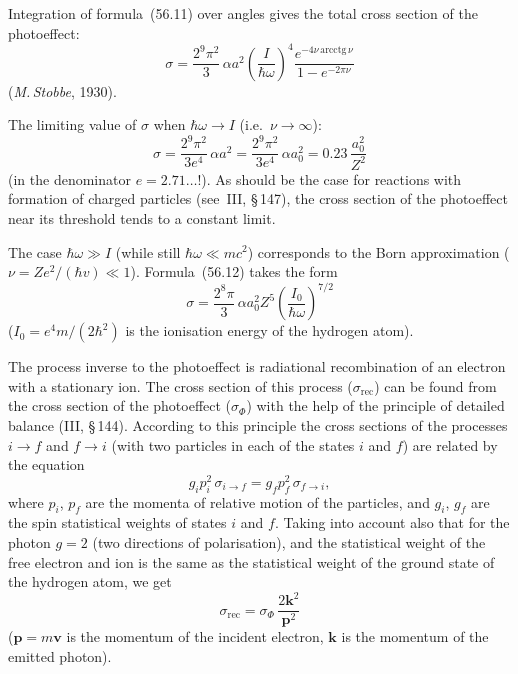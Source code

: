 Integration of formula~(56.11) over angles gives the total cross section of the photoeffect:
\begin{equation}
\sigma = \frac{2^9\pi^2}{3}\,\alpha a^2\left(\frac{I}{\hbar\omega}\right)^{\!4}\frac{e^{-4\nu\,\mathrm{arcctg}\,\nu}}{1-e^{-2\pi\nu}}
\tag{56.12}
\end{equation}
(\textit{M.\,Stobbe}, 1930).

The limiting value of $\sigma$ when $\hbar\omega \to I$ (i.e.\ $\nu \to \infty$):
\begin{equation}
\sigma = \frac{2^9\pi^2}{3e^4}\,\alpha a^2 = \frac{2^9\pi^2}{3e^4}\,\alpha a^2_0 = 0.23\,\frac{a^2_0}{Z^2}
\tag{56.13}
\end{equation}
(in the denominator $e = 2.71\ldots$!). As should be the case for reactions with formation of charged particles (see~III, \S\,147), the cross section of the photoeffect near its threshold tends to a constant limit.

The case $\hbar\omega \gg I$ (while still $\hbar\omega \ll mc^2$) corresponds to the Born approximation ($\nu = Ze^2/(\hbar v) \ll 1$). Formula~(56.12) takes the form
\begin{equation}
\sigma = \frac{2^8\pi}{3}\,\alpha a^2_0 Z^5\left(\frac{I_0}{\hbar\omega}\right)^{\!7/2}
\tag{56.14}
\end{equation}
($I_0 = e^4m/(2\hbar^2)$ is the ionisation energy of the hydrogen atom).

The process inverse to the photoeffect is radiational recombination of an electron with a stationary ion. The cross section of this process ($\sigma_\mathrm{rec}$) can be found from the cross section of the photoeffect ($\sigma_\Phi$) with the help of the principle of detailed balance (III, \S\,144). According to this principle the cross sections of the processes $i \to f$ and $f \to i$ (with two particles in each of the states $i$ and $f$) are related by the equation
\[
g_i p^2_i\,\sigma_{i\to f} = g_f p^2_f\,\sigma_{f\to i},
\]
where $p_i$, $p_f$ are the momenta of relative motion of the particles, and $g_i$, $g_f$ are the spin statistical weights of states $i$ and $f$. Taking into account also that for the photon $g = 2$ (two directions of polarisation), and the statistical weight of the free electron and ion is the same as the statistical weight of the ground state of the hydrogen atom, we get
\begin{equation}
\sigma_\mathrm{rec} = \sigma_\Phi\,\frac{2\mathbf{k}^2}{\mathbf{p}^2}
\tag{56.15}
\end{equation}
($\mathbf{p} = m\mathbf{v}$ is the momentum of the incident electron, $\mathbf{k}$ is the momentum of the emitted photon).

